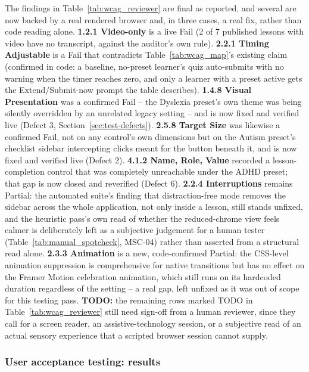 \documentclass[12pt, oneside]{article} %
\begin{document}
The findings in Table~\ref{tab:wcag_reviewer} are final as reported, and several are now backed by a real rendered browser and, in three cases, a real fix, rather than code reading alone. \textbf{1.2.1 Video-only} is a live Fail (2 of 7 published lessons with video have no transcript, against the auditor's own rule). \textbf{2.2.1 Timing Adjustable} is a Fail that contradicts Table~\ref{tab:wcag_map}'s existing claim (confirmed in code: a baseline, no-preset learner's quiz auto-submits with no warning when the timer reaches zero, and only a learner with a preset active gets the Extend/Submit-now prompt the table describes). \textbf{1.4.8 Visual Presentation} was a confirmed Fail -- the Dyslexia preset's own theme was being silently overridden by an unrelated legacy setting -- and is now fixed and verified live (Defect 3, Section~\ref{sec:test-defects}). \textbf{2.5.8 Target Size} was likewise a confirmed Fail, not on any control's own dimensions but on the Autism preset's checklist sidebar intercepting clicks meant for the button beneath it, and is now fixed and verified live (Defect 2). \textbf{4.1.2 Name, Role, Value} recorded a lesson-completion control that was completely unreachable under the ADHD preset; that gap is now closed and reverified (Defect 6). \textbf{2.2.4 Interruptions} remains Partial: the automated suite's finding that distraction-free mode removes the sidebar across the whole application, not only inside a lesson, still stands unfixed, and the heuristic pass's own read of whether the reduced-chrome view feels calmer is deliberately left as a subjective judgement for a human tester (Table~\ref{tab:manual_spotcheck}, MSC-04) rather than asserted from a structural read alone. \textbf{2.3.3 Animation} is a new, code-confirmed Partial: the CSS-level animation suppression is comprehensive for native transitions but has no effect on the Framer Motion celebration animation, which still runs on its hardcoded duration regardless of the setting -- a real gap, left unfixed as it was out of scope for this testing pass. \textbf{TODO:} the remaining rows marked TODO in Table~\ref{tab:wcag_reviewer} still need sign-off from a human reviewer, since they call for a screen reader, an assistive-technology session, or a subjective read of an actual sensory experience that a scripted browser session cannot supply.

\subsubsection{User acceptance testing: results}
\end{document}
